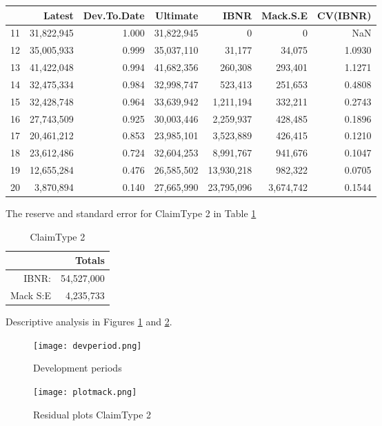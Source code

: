 \documentclass[a4paper]{article}
\begin{document}
\begin{table}[ht]
\centering
\begin{tabular}{rrrrrrr}
      & Latest& Dev.To.Date&   Ultimate&       IBNR&  Mack.S.E& CV(IBNR) \\
  \hline
11& 31,822,945&       1.000& 31,822,945&          0&         0&      NaN\\
12 &35,005,933 &      0.999& 35,037,110&     31,177&    34,075&   1.0930\\
13 &41,422,048   &    0.994& 41,682,356&    260,308&   293,401 &  1.1271\\
14& 32,475,334 &      0.984& 32,998,747&    523,413 &  251,653&   0.4808\\
15& 32,428,748   &    0.964& 33,639,942& 1,211,194   &332,211 &  0.2743\\
16& 27,743,509  &     0.925 &30,003,446&  2,259,937 &  428,485&   0.1896\\
17& 20,461,212   &    0.853& 23,985,101&  3,523,889 &  426,415 &  0.1210\\
18 &23,612,486   &    0.724 &32,604,253&  8,991,767 &  941,676&   0.1047\\
19 &12,655,284  &     0.476& 26,585,502& 13,930,218 &  982,322&   0.0705\\
20&  3,870,894  &     0.140& 27,665,990& 23,795,096 &3,674,742&   0.1544\\
   \hline
\end{tabular}
\end{table}


The reserve and standard error for ClaimType 2 in Table \ref{tab:mack2}
\begin{table}[!ht]
\center
\begin{tabular}{rr}
	& Totals \\ 
\hline
IBNR: & 54,527,000 \\
Mack S:E & 4,235,733\\
\hline
\end{tabular}
\caption{ClaimType 2} \label{tab:mack2}
\end{table}

Descriptive analysis in Figures \ref{fig:dev} and \ref{fig:mack}.
 \begin{figure}[h]
 \center
  \texttt{[image: devperiod.png]}
  \caption{Development periods}
  \label{fig:dev}
\end{figure}

 \begin{figure}[H]
 \center
  \texttt{[image: plotmack.png]}
  \caption{Residual plots ClaimType 2}
  \label{fig:mack}
\end{figure}
\end{document}
